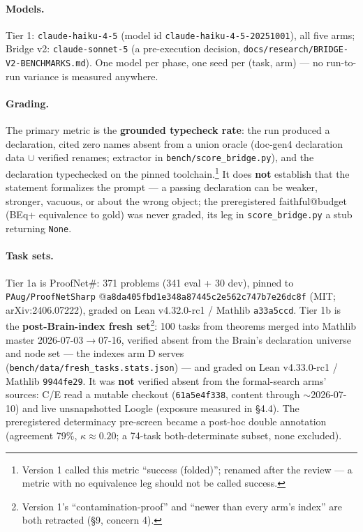 \documentclass[10pt]{article}
\newcommand{\code}[1]{\texttt{#1}}
\begin{document}
{\sloppy
\paragraph{Models.} Tier 1: \code{claude-haiku-4-5} (model id
\code{claude-haiku-4-5-20251001}), all five arms; Bridge v2:
\code{claude-sonnet-5} (a pre-execution decision,
\code{docs/research/BRIDGE-V2-BENCHMARKS.md}). One model per phase, one
seed per (task, arm) --- no run-to-run variance is measured anywhere.\par}

\paragraph{Grading.} The primary metric is the \textbf{grounded typecheck
rate}: the run produced a declaration, cited zero names absent from a
union oracle (doc-gen4 declaration data $\cup$ verified renames; extractor
in \code{bench/score\_bridge.py}), and the declaration typechecked on the
pinned toolchain.\footnote{Version 1 called this metric ``success
(folded)''; renamed after the review --- a metric with no equivalence leg
should not be called success.} It does \textbf{not} establish that the
statement formalizes the prompt --- a passing declaration can be weaker,
stronger, vacuous, or about the wrong object; the preregistered
faithful@budget (BEq+ equivalence to gold) was never graded, its leg in
\code{score\_bridge.py} a stub returning \code{None}.

\paragraph{Task sets.} Tier 1a is ProofNet\#: 371 problems (341 eval + 30
dev), pinned to \code{PAug/ProofNetSharp}
@\code{a8da405fbd1e348a87445c2e562c747b7e26dc8f} (MIT; arXiv:2406.07222),
graded on Lean v4.32.0-rc1 / Mathlib \code{a33a5ccd}. Tier 1b is the
\textbf{post-Brain-index fresh set}\footnote{Version 1's
``contamination-proof'' and ``newer than every arm's index'' are both
retracted (\S9, concern 4).}: 100 tasks from theorems merged into Mathlib
master 2026-07-03$\to$07-16, verified absent from the Brain's declaration
universe and node set --- the indexes arm D serves
(\code{bench/data/fresh\_tasks.stats.json}) --- and graded on Lean
v4.33.0-rc1 / Mathlib \code{9944fe29}. It was \textbf{not} verified absent
from the formal-search arms' sources: C/E read a mutable checkout
(\code{61a5e4f338}, content through ${\sim}$2026-07-10) and live
unsnapshotted Loogle (exposure measured in \S4.4). The preregistered
determinacy pre-screen became a post-hoc double annotation (agreement
79\%, $\kappa\approx0.20$; a 74-task both-determinate subset, none
excluded).
\end{document}
